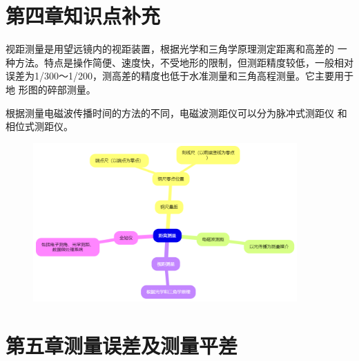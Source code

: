 \documentclass[12pt,a4paper]{article}
\begin{document}
\section*{第四章\quad 知识点补充}

视距测量是用望远镜内的视距装置，根据光学和三角学原理测定距离和高差的
一种方法。特点是操作简便、速度快，不受地形的限制，但测距精度较低，一般相对
误差为1/300～1/200，测高差的精度也低于水准测量和三角高程测量。它主要用于地
形图的碎部测量。 

根据测量电磁波传播时间的方法的不同，电磁波测距仪可以分为脉冲式测距仪
和相位式测距仪。 

    \begin{figure}[H]
        \centering
        \includegraphics[width = 0.9\textwidth]{./figures/8.png}
    \end{figure}
    

\section*{第五章\quad 测量误差及测量平差}
\end{document}
